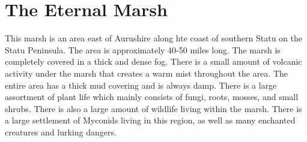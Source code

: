 \section{The Eternal Marsh}

This marsh is an area east of Aurushire along hte coast of southern Statu on the Statu Peninsula. The area is approximately 40-50 miles long. The marsh is completely covered in a thick and dense fog. There is a small amount of volcanic activity under the marsh that creates a warm mist throughout the area. The entire area has a thick mud covering and is always damp. There is a large assortment of plant life which mainly consists of fungi, roots, mosses, and small shrubs. There is also a large amount of wildlife living within the marsh. There is a large settlement of Myconids living in this region, as well as many enchanted creatures and lurking dangers.

